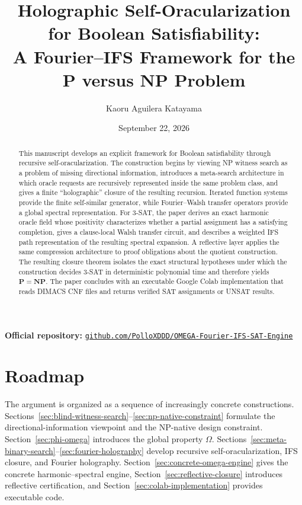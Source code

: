 \documentclass[11pt]{article}
\title{Holographic Self-Oracularization for Boolean Satisfiability:\\A Fourier--IFS Framework for the P versus NP Problem}
\author{Kaoru Aguilera Katayama}
\date{September 22, 2026}
\theoremstyle{plain}
\theoremstyle{definition}
\begin{document}
\maketitle

\begin{center}
\textbf{Official repository:}\quad
\href{https://github.com/PolloXDDD/OMEGA-Fourier-IFS-SAT-Engine}{\texttt{github.com/PolloXDDD/OMEGA-Fourier-IFS-SAT-Engine}}
\end{center}


\begin{abstract}
This manuscript develops an explicit framework for Boolean satisfiability through recursive self-oracularization.  The construction begins by viewing NP witness search as a problem of missing directional information, introduces a meta-search architecture in which oracle requests are recursively represented inside the same problem class, and gives a finite ``holographic'' closure of the resulting recursion.  Iterated function systems provide the finite self-similar generator, while Fourier--Walsh transfer operators provide a global spectral representation.  For 3-SAT, the paper derives an exact harmonic oracle field whose positivity characterizes whether a partial assignment has a satisfying completion, gives a clause-local Walsh transfer circuit, and describes a weighted IFS path representation of the resulting spectral expansion.  A reflective layer applies the same compression architecture to proof obligations about the quotient construction.  The resulting closure theorem isolates the exact structural hypotheses under which the construction decides 3-SAT in deterministic polynomial time and therefore yields $\mathbf{P}=\mathbf{NP}$.  The paper concludes with an executable Google Colab implementation that reads DIMACS CNF files and returns verified SAT assignments or UNSAT results.
\end{abstract}

\tableofcontents
\newpage

\section*{Roadmap}
The argument is organized as a sequence of increasingly concrete constructions.  Sections~\ref{sec:blind-witness-search}--\ref{sec:np-native-constraint} formulate the directional-information viewpoint and the NP-native design constraint.  Section~\ref{sec:phi-omega} introduces the global property \(\Omega\).  Sections~\ref{sec:meta-binary-search}--\ref{sec:fourier-holography} develop recursive self-oracularization, IFS closure, and Fourier holography.  Section~\ref{sec:concrete-omega-engine} gives the concrete harmonic--spectral engine, Section~\ref{sec:reflective-closure} introduces reflective certification, and Section~\ref{sec:colab-implementation} provides executable code.
\end{document}

